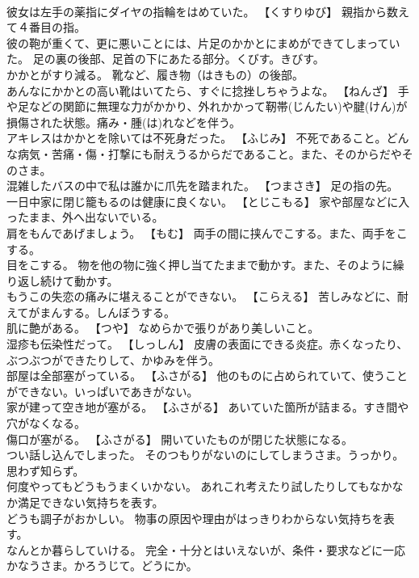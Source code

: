 \documentclass[8pt]{extreport}
\begin{document}
\begin{CJK}{UTF8}{min}
\\	彼女は左手の薬指にダイヤの指輪をはめていた。	【くすりゆび】 親指から数えて４番目の指。
\\	彼の鞄が重くて、更に悪いことには、片足のかかとにまめができてしまっていた。	足の裏の後部、足首の下にあたる部分。くびす。きびす。
\\	かかとがすり減る。	靴など、履き物（はきもの）の後部。
\\	あんなにかかとの高い靴はいてたら、すぐに捻挫しちゃうよな。	【ねんざ】 手や足などの関節に無理な力がかかり、外れかかって靭帯(じんたい)や腱(けん)が損傷された状態。痛み・腫(は)れなどを伴う。
\\	アキレスはかかとを除いては不死身だった。	【ふじみ】 不死であること。どんな病気・苦痛・傷・打撃にも耐えうるからだであること。また、そのからだやそのさま。
\\	混雑したバスの中で私は誰かに爪先を踏まれた。	【つまさき】 足の指の先。
\\	一日中家に閉じ籠もるのは健康に良くない。	【とじこもる】 家や部屋などに入ったまま、外へ出ないでいる。
\\	肩をもんであげましょう。	【もむ】 両手の間に挟んでこする。また、両手をこする。
\\	目をこする。	物を他の物に強く押し当てたままで動かす。また、そのように繰り返し続けて動かす。
\\	もうこの失恋の痛みに堪えることができない。	【こらえる】 苦しみなどに、耐えてがまんする。しんぼうする。
\\	肌に艶がある。	【つや】 なめらかで張りがあり美しいこと。
\\	湿疹も伝染性だって。	【しっしん】 皮膚の表面にできる炎症。赤くなったり、ぶつぶつができたりして、かゆみを伴う。
\\	部屋は全部塞がっている。	【ふさがる】 他のものに占められていて、使うことができない。いっぱいであきがない。
\\	家が建って空き地が塞がる。	【ふさがる】 あいていた箇所が詰まる。すき間や穴がなくなる。
\\	傷口が塞がる。	【ふさがる】 開いていたものが閉じた状態になる。
\\	つい話し込んでしまった。	そのつもりがないのにしてしまうさま。うっかり。思わず知らず。
\\	何度やってもどうもうまくいかない。	あれこれ考えたり試したりしてもなかなか満足できない気持ちを表す。
\\	どうも調子がおかしい。	物事の原因や理由がはっきりわからない気持ちを表す。
\\	なんとか暮らしていける。	完全・十分とはいえないが、条件・要求などに一応かなうさま。かろうじて。どうにか。

\end{CJK}
\end{document}
